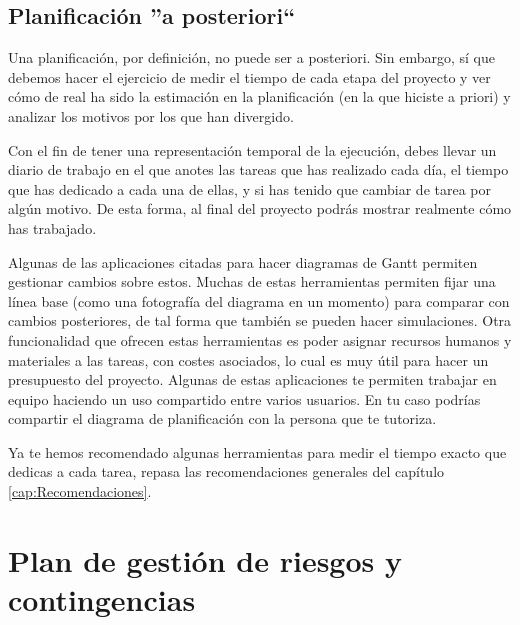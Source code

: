 \subsection{Planificación ''a posteriori``}

Una planificación, por definición, no puede ser a posteriori. Sin embargo, sí que debemos hacer el ejercicio de medir el tiempo de cada etapa del proyecto y ver cómo de real ha sido la estimación en la planificación (en la que hiciste a priori) y analizar los motivos por los que han divergido.

Con el fin de tener una representación temporal de la ejecución, debes llevar un diario de trabajo en el que anotes las tareas que has realizado cada día, el tiempo que has dedicado a cada una de ellas, y si has tenido que cambiar de tarea por algún motivo. De esta forma, al final del proyecto podrás mostrar realmente cómo has trabajado.


Algunas de las aplicaciones citadas para hacer diagramas de Gantt permiten gestionar cambios sobre estos. Muchas de estas herramientas permiten fijar una línea base (como una fotografía del diagrama en un momento) para comparar con cambios posteriores, de tal forma que también se pueden hacer simulaciones. Otra funcionalidad que ofrecen estas herramientas es poder asignar recursos humanos y materiales a las tareas, con costes asociados, lo cual es muy útil para hacer un presupuesto del proyecto. Algunas de estas aplicaciones te permiten trabajar en equipo haciendo un uso compartido entre varios usuarios. En tu caso podrías compartir el diagrama de planificación con la persona que te tutoriza.

Ya te hemos recomendado algunas herramientas para medir el tiempo exacto que dedicas a cada tarea, repasa las recomendaciones generales del capítulo \ref{cap:Recomendaciones}.



\section{Plan de gestión de riesgos y contingencias}

